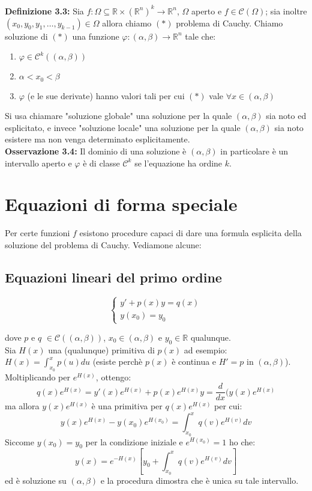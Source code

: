 \documentclass[a4paper,11pt,titlepage]{book}
\begin{document}
\textbf{Definizione 3.3:}  Sia $f:\Omega\subseteq\mathbb{R}\times (\mathbb{R}^n)^k\to\mathbb{R}^n$, $\Omega$ aperto e $f\in\mathcal{C}(\Omega)$; sia inoltre $(x_0,y_0,y_1,\ldots,y_{k-1})\in\Omega$ allora chiamo $(*)$ problema di Cauchy. Chiamo soluzione di $(*)$ una funzione $\varphi:(\alpha,\beta)\to\mathbb{R}^n$ tale che:\begin{enumerate}
\item $\varphi\in\mathcal{C}^k((\alpha,\beta))$
\item $\alpha<x_0<\beta$
\item $\varphi$ (e le sue derivate) hanno valori tali per cui $(*)$ vale $\forall x\in(\alpha,\beta)$
\end{enumerate}
Si usa chiamare "soluzione globale" una soluzione per la quale $(\alpha,\beta)$ sia noto ed esplicitato, e invece "soluzione locale" una soluzione per la quale $(\alpha,\beta)$ sia noto esistere ma non venga determinato esplicitamente.\\

\textbf{Osservazione 3.4:} Il dominio di una soluzione è $(\alpha,\beta)$ in particolare è un intervallo aperto e $\varphi$ è di classe $\mathcal{C}^k$ se l'equazione ha ordine $k$.

\section{Equazioni di forma speciale}

Per certe funzioni $f$ esistono procedure capaci di dare una formula esplicita della soluzione del problema di Cauchy. Vediamone alcune:

\subsection{Equazioni lineari del primo ordine}


$$\begin{cases}
y'+p(x)y=q(x)\\
y(x_0)=y_0
\end{cases}$$

dove $p$ e $q$ $\in\mathcal{C}((\alpha,\beta))$, $x_0\in(\alpha,\beta)$ e $y_0\in\mathbb{R}$ qualunque.\\

Sia $H(x)$ una (qualunque) primitiva di $p(x)$ ad esempio: $H(x)=\int_{x_0}^xp(u)du$ (esiste perchè $p(x)$ è continua e $H'=p$ in $(\alpha,\beta)$). Moltiplicando per $e^{H(x)}$, ottengo: $$q(x)e^{H(x)}=y'(x)e^{H(x)}+p(x)e^{H(x)}y=\frac{d}{dx}(y(x)e^{H(x)}$$ ma allora $y(x)e^{H(x)}$ è una primitiva per $q(x)e^{H(x)}$ per cui: $$y(x)e^{H(x)}-y(x_0)e^{H(x_0)}=\int_{x_0}^xq(v)e^{H(v)}dv$$ Siccome $y(x_0)=y_0$ per la condizione iniziale e $e^{H(x_0)}=1$ ho che: $$\boxed{y(x)=e^{-H(x)}\left[y_0+\int_{x_0}^xq(v)e^{H(v)}dv\right]}$$ ed è soluzione su $(\alpha,\beta)$ e la procedura dimostra che è unica su tale intervallo.\\
\end{document}
